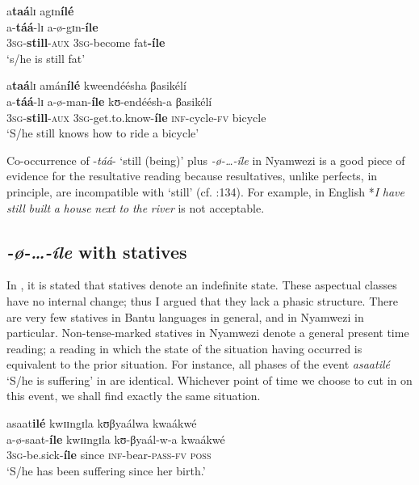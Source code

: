 \documentclass[output=paper,newtxmath,modfonts,nonflat,draftmode]{langsci/langscibook}
\begin{document}
\ea \label{ex:kanijo:17}
\ea
    \glll a\textbf{taá}lɪ     agɪn\textbf{ílé}\\ 
    a-\textbf{táá}-lɪ   a-ø-gɪn-\textbf{íle}\\
    3\textsc{sg}-\textbf{still}-\textsc{aux} 3\textsc{sg}-become fat\textbf{-íle}\\
    \glt ‘s/he is still fat’

\ex  
    \glll a\textbf{taá}lɪ    amán\textbf{ílé}    kweendéésha βasikélí\\
    a-\textbf{táá}-lɪ       a-ø-man-\textbf{íle}    kʊ-endéésh-a βasikélí\\
    3\textsc{sg}-\textbf{still}-\textsc{aux} 3\textsc{sg}-get.to.know-\textbf{íle} \textsc{inf}-cycle-\textsc{fv}   bicycle \\
    \glt ‘S/he still knows how to ride a bicycle’
\z
\z

Co-occurrence of -\textit{táá}- ‘still (being)’ plus \textit{-ø}\textit{-\ldots-íle} in Nyamwezi is a good piece of evidence for the resultative reading because resultatives, unlike perfects, in principle, are incompatible with ‘still’ (cf. \citealt{Dahl1985}:134). For example, in English *\textit{I} \textit{have} \textit{still} \textit{built} \textit{a} \textit{house} \textit{next} \textit{to} \textit{the} \textit{river} is not acceptable.  

 \subsection{\textit{-}\textit{ø-…-íle} with statives}
 

In , it is stated that statives denote an indefinite state. These aspectual classes have no internal change; thus I argued that they lack a phasic structure. There are very few statives in Bantu languages in general, and in Nyamwezi in particular. Non-tense-marked statives in Nyamwezi denote a general present time reading; a reading in which the state of the situation having occurred is equivalent to the prior situation. For instance, all phases of the event \textit{asaatilé} ‘S/he is suffering’ in  are identical. Whichever point of time we choose to cut in on this event, we shall find exactly the same situation. 

\ea \label{ex:kanijo:18}
\ea 
    \glll asaat\textbf{ilé}  kwɪɪngɪla  kʊβyaálwa  kwaákwé\\
    a-ø-saat-\textbf{íle}       kwɪɪngɪla kʊ-βyaál-w-a       kwaákwé\\
    3\textsc{sg}-be.sick-\textbf{íle} since \textsc{inf}-bear-\textsc{pass}-\textsc{fv} \textsc{poss}\\
    \glt ‘S/he has been suffering since her birth.’
\end{document}
